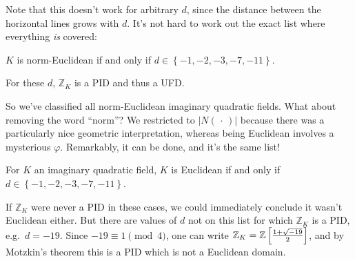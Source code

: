 \begin{example}[?]
\begin{figure}
{
}
\end{figure}

\end{example}

\begin{remark}

Note that this doesn't work for arbitrary \(d\), since the distance
between the horizontal lines grows with \(d\). It's not hard to work out
the exact list where everything \emph{is} covered:

\end{remark}

\begin{theorem}[?]

\(K\) is norm-Euclidean if and only if
\(d\in \left\{{-1,-2,-3,-7,-11}\right\}\).

\end{theorem}

\begin{corollary}[?]

For these \(d\), \({\mathbb{Z}}_K\) is a PID and thus a UFD.

\end{corollary}

\begin{remark}

So we've classified all norm-Euclidean imaginary quadratic fields. What
about removing the word ``norm''? We restricted to
\({\left\lvert {N({\,\cdot\,})} \right\rvert}\) because there was a
particularly nice geometric interpretation, whereas being Euclidean
involves a mysterious \(\varphi\). Remarkably, it can be done, and it's
the same list!

\end{remark}

\begin{theorem}[Motzkin]

For \(K\) an imaginary quadratic field, \(K\) is Euclidean if and only
if \(d\in \left\{{-1,-2,-3,-7,-11}\right\}\).

\end{theorem}

\begin{remark}

If \({\mathbb{Z}}_K\) were never a PID in these cases, we could
immediately conclude it wasn't Euclidean either. But there are values of
\(d\) not on this list for which \({\mathbb{Z}}_K\) is a PID,
e.g.~\(d=-19\). Since \(-19 \equiv 1 \pmod 4\), one can write
\({\mathbb{Z}}_K = {\mathbb{Z}}\left[ {1 + \sqrt{-19} \over 2}\right]\),
and by Motzkin's theorem this is a PID which is not a Euclidean domain.

\end{remark}

